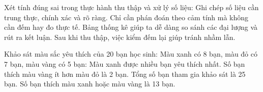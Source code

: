 \begin{ex} %
Xét tính đúng sai trong thực hành thu thập và xử lý số liệu:
\choiceTF
{\True Ghi chép số liệu cần trung thực, chính xác và rõ ràng.}
{Chỉ cần phán đoán theo cảm tính mà không cần đếm hay đo thực tế.}
{\True Bảng thống kê giúp ta dễ dàng so sánh các đại lượng và rút ra kết luận.}
{\True Sau khi thu thập, việc kiểm đếm lại giúp tránh nhầm lẫn.}
\end{ex}

\begin{ex} %
Khảo sát màu sắc yêu thích của 20 bạn học sinh: Màu xanh có 8 bạn, màu đỏ có 7 bạn, màu vàng có 5 bạn:
\choiceTF
{\True Màu xanh được nhiều bạn yêu thích nhất.}
{\True Số bạn thích màu vàng ít hơn màu đỏ là 2 bạn.}
{Tổng số bạn tham gia khảo sát là 25 bạn.}
{\True Số bạn thích màu xanh hoặc màu vàng là 13 bạn.}
\end{ex}

